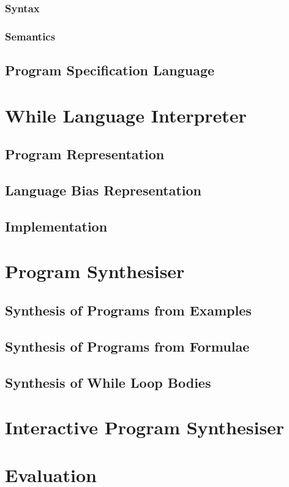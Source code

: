 \documentclass[a4paper,twoside,notitlepage]{article}
\begin{document}
\subsubsection{Syntax}
\subsubsection{Semantics}
\subsection{Program Specification Language}
\clearpage

\section{While Language Interpreter}
\subsection{Program Representation}
\subsection{Language Bias Representation}
\subsection{Implementation}
\clearpage

\section{Program Synthesiser}
\subsection{Synthesis of Programs from Examples}
\subsection{Synthesis of Programs from Formulae}
\subsection{Synthesis of While Loop Bodies}
\clearpage

\section{Interactive Program Synthesiser}
\clearpage

\section{Evaluation}
\end{document}
